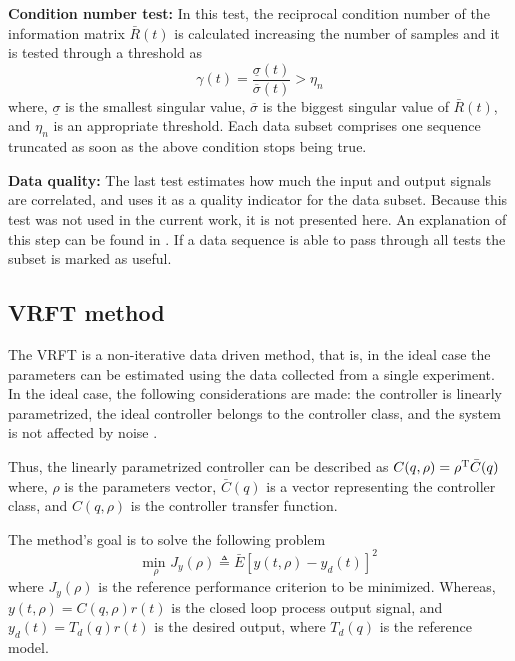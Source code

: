 \textbf{Condition number test:} In this test, the reciprocal condition number of the information matrix $\bar{R}(t)$ is calculated increasing the number of samples and it is tested through a threshold as
\begin{equation}
	\gamma(t) = \frac{\underline{\sigma}(t)}{\overline{\sigma}(t)} > \eta_n
\label{eq:cond_number}
\end{equation}
where, $\underline{\sigma}$ is the smallest singular value, $\overline{\sigma}$ is the biggest singular value of $\bar{R}(t)$, and $\eta_n$ is an appropriate threshold.
Each data subset comprises one sequence truncated as soon as the above condition stops being true.

\textbf{Data quality: } The last test estimates how much the input and output signals are correlated, and uses it as a quality indicator for the data subset.
Because this test was not used in the current work, it is not presented here.
An explanation of this step can be found in \cite{bittencourt2015algorithm}.
If a data sequence is able to pass through all tests the subset is marked as useful.

\subsection{\label{sub:vrft} VRFT method}
The VRFT is a non-iterative data driven method, that is, in the ideal case the parameters can be estimated using the data collected from a single experiment.
In the ideal case, the following considerations are made: the controller is linearly parametrized, the ideal controller belongs to the controller class, and the system is not affected by noise \cite{bazanella2011data}.

Thus, the linearly parametrized controller can be described as $ C(q, \rho) = \rho^\text{T} \bar{C}(q)$
where, $\rho$ is the parameters vector, $\bar{C}(q)$ is a vector representing the controller class, and $C(q, \rho)$ is the controller transfer function.

The method's goal is to solve the following problem
\begin{equation}
	\underset{\rho}{\text{min }} J_y(\rho) \triangleq \bar{E} \left[ y(t, \rho) - y_d(t)  \right]^2
\label{eq:cost_jy}
\end{equation}
where $J_y(\rho)$ is the reference performance criterion to be minimized.
Whereas, $y(t, \rho) = C(q, \rho) r(t)$ is the closed loop process output signal, and $y_d(t) = T_d(q)r(t)$ is the desired output, where $T_d(q)$ is the reference model.

